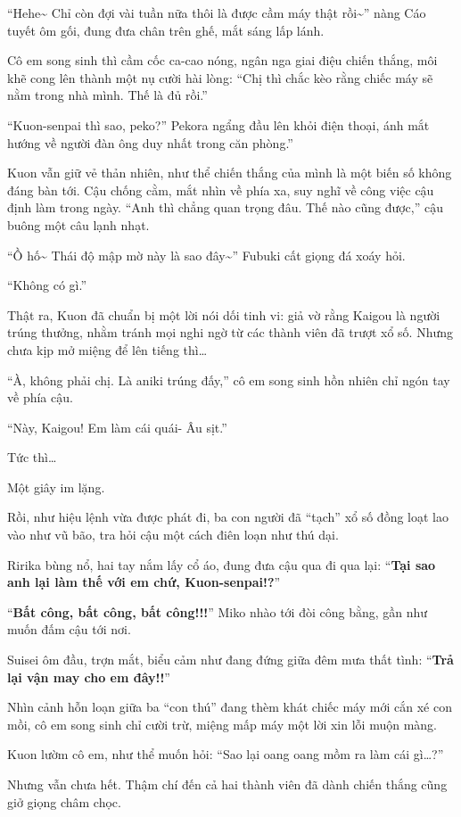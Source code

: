 \documentclass[../main.tex]{subfiles}
\begin{document}
``Hehe\~{} Chỉ còn đợi vài tuần nữa thôi là được cầm máy thật rồi\~{}'' nàng Cáo tuyết ôm gối, đung đưa chân trên ghế, mắt sáng lấp lánh.

Cô em song sinh thì cầm cốc ca-cao nóng, ngân nga giai điệu chiến thắng, môi khẽ cong lên thành một nụ cười hài lòng: ``Chị thì chắc kèo rằng chiếc máy sẽ nằm trong nhà mình. Thế là đủ rồi.''

``Kuon-senpai thì sao, peko?'' Pekora ngẩng đầu lên khỏi điện thoại, ánh mắt hướng về người đàn ông duy nhất trong căn phòng.''

Kuon vẫn giữ vẻ thản nhiên, như thể chiến thắng của mình là một biến số không đáng bàn tới. Cậu chống cằm, mắt nhìn về phía xa, suy nghĩ về công việc cậu định làm trong ngày. ``Anh thì chẳng quan trọng đâu. Thế nào cũng được,'' cậu buông một câu lạnh nhạt.

``Ồ hố\~{} Thái độ mập mờ này là sao đây\~{}'' Fubuki cất giọng đá xoáy hỏi.

``Không có gì.''

Thật ra, Kuon đã chuẩn bị một lời nói dối tinh vi: giả vờ rằng Kaigou là người trúng thưởng, nhằm tránh mọi nghi ngờ từ các thành viên đã trượt xổ số. Nhưng chưa kịp mở miệng để lên tiếng thì\dots

``À, không phải chị. Là aniki trúng đấy,'' cô em song sinh hồn nhiên chỉ ngón tay về phía cậu.

``Này, Kaigou! Em làm cái quái- Âu sịt.''

Tức thì\dots

Một giây im lặng.

Rồi, như hiệu lệnh vừa được phát đi, ba con người đã ``tạch'' xổ số đồng loạt lao vào như vũ bão, tra hỏi cậu một cách điên loạn như thú dại.

Ririka bùng nổ, hai tay nắm lấy cổ áo, đung đưa cậu qua đi qua lại: ``\textbf{Tại sao anh lại làm thế với em chứ, Kuon-senpai!?}''

``\textbf{Bất công, bất công, bất công!!!}'' Miko nhào tới đòi công bằng, gần như muốn đấm cậu tới nơi.

Suisei ôm đầu, trợn mắt, biểu cảm như đang đứng giữa đêm mưa thất tình: ``\textbf{Trả lại vận may cho em đây!!}''

Nhìn cảnh hỗn loạn giữa ba ``con thú'' đang thèm khát chiếc máy mới cắn xé con mồi, cô em song sinh chỉ cười trừ, miệng mấp máy một lời xin lỗi muộn màng.

Kuon lườm cô em, như thể muốn hỏi: ``Sao lại oang oang mồm ra làm cái gì\dots?''

Nhưng vẫn chưa hết. Thậm chí đến cả hai thành viên đã dành chiến thắng cũng giở giọng châm chọc.
\end{document}
